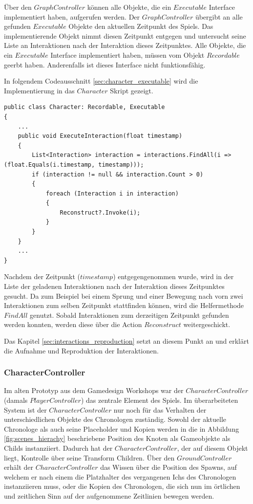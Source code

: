 Über den $GraphController$ können alle Objekte, die ein $Executable$ Interface implementiert haben, aufgerufen werden. Der $GraphController$ übergibt an alle gefunden $Executable$ Objekte den aktuellen Zeitpunkt des Spiels. Das implementierende Objekt nimmt diesen Zeitpunkt entgegen und untersucht seine Liste an Interaktionen nach der Interaktion dieses Zeitpunktes. Alle Objekte, die ein $Executable$ Interface implementiert haben, müssen vom Objekt $Recordable$ geerbt haben. Anderenfalls ist dieses Interface nicht funktionsfähig.

In folgendem Codeausschnitt \ref{sec:character_executable} wird die Implementierung in das $Character$ Skript gezeigt.

\begin{lstlisting}[caption={Character.ts dieses Prototyps}, label={sec:character_executable}]
public class Character: Recordable, Executable
{
    ...
    public void ExecuteInteraction(float timestamp)
    {
        List<Interaction> interaction = interactions.FindAll(i => (float.Equals(i.timestamp, timestamp)));
        if (interaction != null && interaction.Count > 0)
        {
            foreach (Interaction i in interaction)
            {
                Reconstruct?.Invoke(i);
            }
        }
    }
    ...
}
\end{lstlisting}

Nachdem der Zeitpunkt ($timestamp$) entgegengenommen wurde, wird in der Liste der geladenen Interaktionen nach der Interaktion dieses Zeitpunktes gesucht. Da zum Beispiel bei einem Sprung und einer Bewegung nach vorn zwei Interaktionen zum selben Zeitpunkt stattfinden können, wird die Helfermethode $FindAll$ genutzt. Sobald Interaktionen zum derzeitigen Zeitpunkt gefunden werden konnten, werden diese über die Action $Reconstruct$ weitergeschickt.

Das Kapitel \ref{sec:interactions_reproduction} setzt an diesem Punkt an und erklärt die Aufnahme und Reproduktion der Interaktionen.

\subsubsection{CharacterController}
Im alten Prototyp aus dem Gamedesign Workshops war der $CharacterController$ (damals $PlayerController$) das zentrale Element des Spiels. Im überarbeiteten System ist der $CharacterController$ nur noch für das Verhalten der unterschiedlichen Objekte des Chronologen zuständig. Sowohl der aktuelle Chronologe als auch seine Placeholder und Kopien werden in die in Abbildung \ref{fig:scenes_hierachy} beschriebene Position des  Knoten als Gameobjekte als Childs instanziiert. Dadurch hat der $CharacterController$, der auf diesem  Objekt liegt, Kontrolle über seine Transform Children. Über den $GroundController$ erhält der $CharacterController$ das Wissen über die Position des Spawns, auf welchem er nach einem  die Platzhalter des vergangenen Ichs des Chronologen instanziieren muss, oder die Kopien des Chronologen, die sich nun im örtlichen und zeitlichen Sinn auf der aufgenommene Zeitlinien bewegen werden. 


